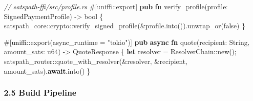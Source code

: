 \documentclass[
]{article}
\newenvironment{Shaded}{}{}
\newcommand{\AttributeTok}[1]{\textcolor[rgb]{0.49,0.56,0.16}{#1}}
\newcommand{\CommentTok}[1]{\textcolor[rgb]{0.38,0.63,0.69}{\textit{#1}}}
\newcommand{\ConstantTok}[1]{\textcolor[rgb]{0.53,0.00,0.00}{#1}}
\newcommand{\DataTypeTok}[1]{\textcolor[rgb]{0.56,0.13,0.00}{#1}}
\newcommand{\KeywordTok}[1]{\textcolor[rgb]{0.00,0.44,0.13}{\textbf{#1}}}
\newcommand{\NormalTok}[1]{#1}
\newcommand{\OperatorTok}[1]{\textcolor[rgb]{0.40,0.40,0.40}{#1}}
\newcommand{\PreprocessorTok}[1]{\textcolor[rgb]{0.74,0.48,0.00}{#1}}
\newcommand{\StringTok}[1]{\textcolor[rgb]{0.25,0.44,0.63}{#1}}
\begin{document}
\begin{Shaded}
\begin{Highlighting}[]
\CommentTok{// satspath{-}ffi/src/profile.rs}
\AttributeTok{\#[}\PreprocessorTok{uniffi::}\NormalTok{export}\AttributeTok{]}
\KeywordTok{pub} \KeywordTok{fn}\NormalTok{ verify\_profile(profile}\OperatorTok{:}\NormalTok{ SignedPaymentProfile) }\OperatorTok{{-}\textgreater{}} \DataTypeTok{bool} \OperatorTok{\{}
    \PreprocessorTok{satspath\_core::crypto::}\NormalTok{verify\_signed\_profile(}\OperatorTok{\&}\NormalTok{profile}\OperatorTok{.}\NormalTok{into())}\OperatorTok{.}\NormalTok{unwrap\_or(}\ConstantTok{false}\NormalTok{)}
\OperatorTok{\}}

\AttributeTok{\#[}\PreprocessorTok{uniffi::}\NormalTok{export}\AttributeTok{(}\NormalTok{async\_runtime }\OperatorTok{=} \StringTok{"tokio"}\AttributeTok{)]}
\KeywordTok{pub} \KeywordTok{async} \KeywordTok{fn}\NormalTok{ quote(recipient}\OperatorTok{:} \DataTypeTok{String}\OperatorTok{,}\NormalTok{ amount\_sats}\OperatorTok{:} \DataTypeTok{u64}\NormalTok{) }\OperatorTok{{-}\textgreater{}}\NormalTok{ QuoteResponse }\OperatorTok{\{}
    \KeywordTok{let}\NormalTok{ resolver }\OperatorTok{=} \PreprocessorTok{ResolverChain::}\NormalTok{new()}\OperatorTok{;}
    \PreprocessorTok{satspath\_router::}\NormalTok{quote\_with\_resolver(}\OperatorTok{\&}\NormalTok{resolver}\OperatorTok{,} \OperatorTok{\&}\NormalTok{recipient}\OperatorTok{,}\NormalTok{ amount\_sats)}\OperatorTok{.}\KeywordTok{await}\OperatorTok{.}\NormalTok{into()}
\OperatorTok{\}}
\end{Highlighting}
\end{Shaded}

\hypertarget{build-pipeline}{%
\subsubsection{2.5 Build Pipeline}\label{build-pipeline}}
\end{document}
